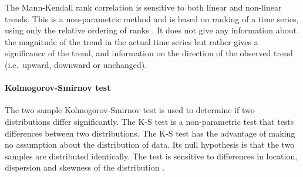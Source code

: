 The Mann-Kendall rank correlation \citep{mann1945-245,kendall1975-202} is
sensitive to both linear and non-linear trends. This is a non-parametric method
and is based on ranking of a time series, using only the relative ordering of
ranks \citep{press1996-933}. It does not give any information about the
magnitude of the trend in the actual time series but rather gives a significance
of the trend, and information on the direction of the observed trend (i.e.\
upward, downward or unchanged).

%
%
%
%
%

\paragraph{Kolmogorov-Smirnov test}
\label{sec:KolmogorovSmirnovTest}
The two sample Kolmogorov-Smirnov test is used to determine if two distributions
differ significantly. The K-S test is a non-parametric test that tests
differences between two distributions. The K-S test has the advantage of making
no assumption about the distribution of data. Its null hypothesis is that the
two samples are distributed identically. The test is sensitive to differences in
location, dispersion and skewness of the distribution \citep{sokal1995-887}.

